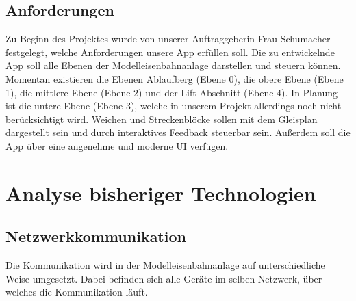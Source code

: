 \documentclass{article}
\begin{document}
\subsection{Anforderungen}
Zu Beginn des Projektes wurde von unserer Auftraggeberin Frau Schumacher festgelegt, welche Anforderungen unsere App erfüllen soll.
Die zu entwickelnde App soll alle Ebenen der Modelleisenbahnanlage darstellen und steuern können.
Momentan existieren die Ebenen Ablaufberg (Ebene 0), die obere Ebene (Ebene 1), die mittlere Ebene (Ebene 2) und der Lift-Abschnitt (Ebene 4).
In Planung ist die untere Ebene (Ebene 3), welche in unserem Projekt allerdings noch nicht berücksichtigt wird.
Weichen und Streckenblöcke sollen mit dem Gleisplan dargestellt sein und durch interaktives Feedback steuerbar sein.
Außerdem soll die App über eine angenehme und moderne UI verfügen.

\section{Analyse bisheriger Technologien}
\subsection{Netzwerkkommunikation}
Die Kommunikation wird in der Modelleisenbahnanlage auf unterschiedliche Weise umgesetzt.
Dabei befinden sich alle Geräte im selben Netzwerk, über welches die Kommunikation läuft.
\end{document}
